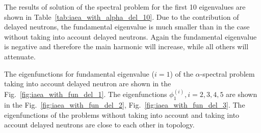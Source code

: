 \documentclass[authoryear]{elsarticle}
\begin{document}
The results of solution of the spectral problem for the first 10 eigenvalues are shown in Table~\ref{tab:iaea_with_alpha_del_10}.
Due to the contribution of delayed neutrons, the fundamental eigenvalue is much smaller than in the case without taking into account delayed neutrons.
Again the fundamental eigenvalue is negative and therefore the main harmonic will increase, while all others will attenuate.

The eigenfunctions for fundamental eigenvalue ($i=1$) of the $\alpha$-spectral problem taking into account delayed neutron are shown in the Fig.~\ref{fig:iaea_with_fun_del_1}. 
The eigenfunctions $\phi_1^{(i)}, i=2,3,4,5$ are shown in the Fig.~\ref{fig:iaea_with_fun_del_2}, Fig.~\ref{fig:iaea_with_fun_del_3}.
The eigenfunctions of the problems without taking into account and taking into account delayed neutrons are close to each other in topology.
\end{document}

